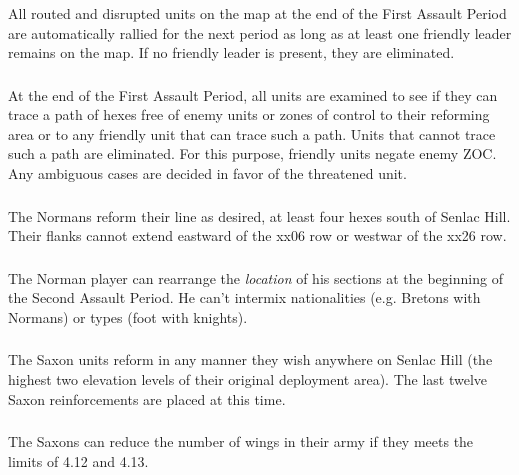 \subsubsection[Routed and Disrupted Units]{} All routed and disrupted units on the map at the end of the First Assault Period are automatically rallied for the next period as long as at least one friendly leader remains on the map. If no friendly leader is present, they are eliminated.

\subsubsection[Reforming Area]{} At the end of the First Assault Period, all units are examined to see if they can trace a path of hexes free of enemy units or zones of control to their reforming area or to any friendly unit that can trace such a path. Units that cannot trace such a path are eliminated. For this purpose, friendly units negate enemy ZOC. Any ambiguous cases are decided in favor of the threatened unit.

\subsubsection[Norman Reform]{} The Normans reform their line as desired, at least four hexes south of Senlac Hill. Their flanks cannot extend eastward of the xx06 row or westwar of the xx26 row.

\subsubsection[Norman Rearrangement]{} The Norman player can rearrange the \textit{location} of his sections at the beginning of the Second Assault Period. He can't intermix nationalities (e.g. Bretons with Normans) or types (foot with knights).

\subsubsection[Saxon Reform]{} The Saxon units reform in any manner they wish anywhere on Senlac Hill (the highest two elevation levels of their original deployment area). The last twelve Saxon reinforcements are placed at this time.

\subsubsection[Saxon Reduction]{} The Saxons can reduce the number of wings in their army if they meets the limits of 4.12 and 4.13.
